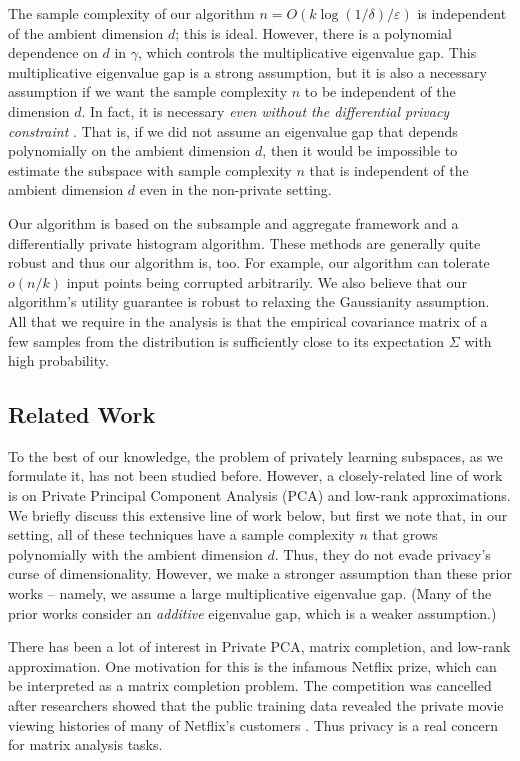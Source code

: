 The sample complexity of our algorithm $n=O(k \log(1/\delta)/\varepsilon)$ is independent of the ambient dimension $d$; this is ideal. However, there is a polynomial dependence on $d$ in $\gamma$, which controls the multiplicative eigenvalue gap. %
This multiplicative eigenvalue gap is a strong assumption, but it is also a necessary assumption if we want the sample complexity $n$ to be independent of the dimension $d$. In fact, it is necessary \emph{even without the differential privacy constraint} \cite{CaiZ16}. That is, if we did not assume an eigenvalue gap that depends polynomially on the ambient dimension $d$, then it would be impossible to estimate the subspace with sample complexity $n$ that is independent of the ambient dimension $d$ even in the non-private setting.

Our algorithm is based on the subsample and aggregate framework \cite{NissimRS07} and a differentially private histogram algorithm. These methods are generally quite robust and thus our algorithm is, too. For example, our algorithm can tolerate $o(n/k)$ input points being corrupted arbitrarily.  We also believe that our algorithm's utility guarantee is robust to relaxing the Gaussianity assumption. All that we require in the analysis is that the empirical covariance matrix of a few samples from the distribution is sufficiently close to its expectation $\Sigma$ with high probability.

\subsection{Related Work}

To the best of our knowledge, the problem of privately learning subspaces, as we formulate it, has not been studied before. However, a closely-related line of work is on Private Principal Component Analysis (PCA) and low-rank approximations. We briefly discuss this extensive line of work below, but first we note that, in our setting, all of these techniques have a sample complexity $n$ that grows polynomially with the ambient dimension $d$. Thus, they do not evade privacy's curse of dimensionality. However, we make a stronger assumption than these prior works -- namely, we assume a large multiplicative eigenvalue gap. (Many of the prior works consider an \emph{additive} eigenvalue gap, which is a weaker assumption.)

There has been a lot of interest in Private PCA, matrix completion, and low-rank approximation. One motivation for this is the infamous Netflix prize, which can be interpreted as a matrix completion problem. The competition was cancelled after researchers showed that the public training data revealed the private movie viewing histories of many of Netflix's customers \cite{NarayananS06}. Thus privacy is a real concern for matrix analysis tasks.

